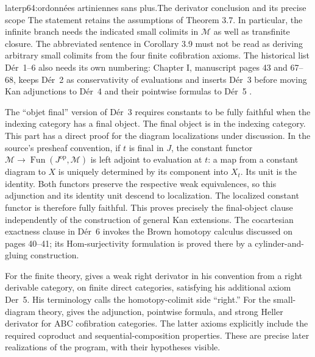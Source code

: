 \begin{dcomment}{later}{p64:ordonnées artiniennes sans plus.}{The derivator conclusion and its precise scope}
The statement retains the assumptions of Theorem 3.7. In particular, the infinite branch needs the indicated small colimits in $\mathcal M$ as well as transfinite closure. The abbreviated sentence in Corollary 3.9 must not be read as deriving arbitrary small colimits from the four finite cofibration axioms. The historical list Dér~1--6 also needs its own numbering: Chapter I, manuscript pages 43 and 67--68, keeps Dér~2 as conservativity of evaluations and inserts Dér~3 before moving Kan adjunctions to Dér~4 and their pointwise formulas to Dér~5 \citep{Grothendieck1990Derivateurs}.

The ``objet final'' version of Dér~3 requires constants to be fully faithful when the indexing category has a final object. The final object is in the indexing category. This part has a direct proof for the diagram localizations under discussion. In the source's presheaf convention, if $t$ is final in $J$, the constant functor $\mathcal M\to\operatorname{Fun}(J^{\mathrm{op}},\mathcal M)$ is left adjoint to evaluation at $t$: a map from a constant diagram to $X$ is uniquely determined by its component into $X_t$. Its unit is the identity. Both functors preserve the respective weak equivalences, so this adjunction and its identity unit descend to localization. The localized constant functor is therefore fully faithful. This proves precisely the final-object clause independently of the construction of general Kan extensions. The cocartesian exactness clause in Dér~6 invokes the Brown homotopy calculus discussed on pages 40--41; its Hom-surjectivity formulation is proved there by a cylinder-and-gluing construction.

For the finite theory, \citet[Corollary 2.24]{Cisinski2010} gives a weak right derivator in his convention from a right derivable category, on finite direct categories, satisfying his additional axiom Der~5. His terminology calls the homotopy-colimit side ``right.'' For the small-diagram theory, \citet[Theorems 9.6.3, 9.6.5, and 10.3.2]{RadulescuBanu2009} gives the adjunction, pointwise formula, and strong Heller derivator for ABC cofibration categories. The latter axioms explicitly include the required coproduct and sequential-composition properties. These are precise later realizations of the program, with their hypotheses visible.


\end{dcomment}
